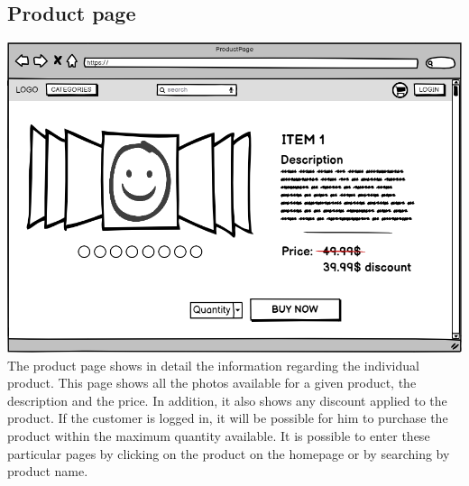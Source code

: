 \subsection{Product page}
    \includegraphics[width=\textwidth,height=\textheight,keepaspectratio]{mockups/productPageMockup.png}
\\
The product page shows in detail the information regarding the individual product.
This page shows all the photos available for a given product, the description and the price.
In addition, it also shows any discount applied to the product.
If the customer is logged in, it will be possible for him to purchase the product within the maximum quantity available. It is possible to enter these particular pages by clicking on the product on the homepage or by searching by product name.

